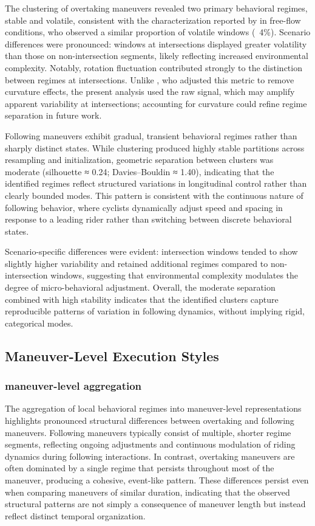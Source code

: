 The clustering of overtaking maneuvers revealed two primary behavioral regimes, stable and volatile, consistent with the characterization reported by \citeauthor{bachir_identifying_2025} in free-flow conditions, who observed a similar proportion of volatile windows (~4\%). Scenario differences were pronounced: windows at intersections displayed greater volatility than those on non-intersection segments, likely reflecting increased environmental complexity. Notably, rotation fluctuation contributed strongly to the distinction between regimes at intersections. Unlike \citeauthor{bachir_identifying_2025}, who adjusted this metric to remove curvature effects, the present analysis used the raw signal, which may amplify apparent variability at intersections; accounting for curvature could refine regime separation in future work. 

Following maneuvers exhibit gradual, transient behavioral regimes rather than sharply distinct states. While clustering produced highly stable partitions across resampling and initialization, geometric separation between clusters was moderate (silhouette ≈ 0.24; Davies–Bouldin ≈ 1.40), indicating that the identified regimes reflect structured variations in longitudinal control rather than clearly bounded modes. This pattern is consistent with the continuous nature of following behavior, where cyclists dynamically adjust speed and spacing in response to a leading rider rather than switching between discrete behavioral states.

Scenario-specific differences were evident: intersection windows tended to show slightly higher variability and retained additional regimes compared to non-intersection windows, suggesting that environmental complexity modulates the degree of micro-behavioral adjustment. Overall, the moderate separation combined with high stability indicates that the identified clusters capture reproducible patterns of variation in following dynamics, without implying rigid, categorical modes.


\subsection{Maneuver-Level Execution Styles}

\subsubsection{maneuver-level aggregation}
The aggregation of local behavioral regimes into maneuver-level representations highlights pronounced structural differences between overtaking and following maneuvers. Following maneuvers typically consist of multiple, shorter regime segments, reflecting ongoing adjustments and continuous modulation of riding dynamics during following interactions. In contrast, overtaking maneuvers are often dominated by a single regime that persists throughout most of the maneuver, producing a cohesive, event-like pattern. These differences persist even when comparing maneuvers of similar duration, indicating that the observed structural patterns are not simply a consequence of maneuver length but instead reflect distinct temporal organization.

